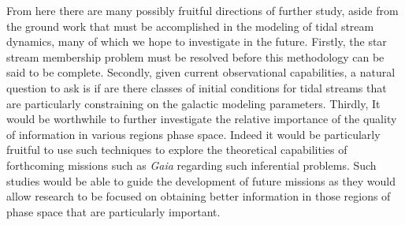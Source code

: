 \documentclass[12pt,preprint]{aastex}
\theoremstyle{plain}
\theoremstyle{definition}
\begin{document}
From here there are many possibly fruitful directions of further study, aside from the ground work that must be accomplished in the modeling of tidal stream dynamics, many of which we hope to investigate in the future. Firstly, the star stream membership problem must be resolved before this methodology can be said to be complete. Secondly, given current observational capabilities, a natural question to ask is if are there  classes of initial conditions for tidal streams that are particularly constraining on the galactic modeling parameters. Thirdly, It would be worthwhile to further investigate the relative importance of the quality of information in various regions phase space. Indeed it would be particularly fruitful to use such techniques to explore the theoretical capabilities of forthcoming missions such as \textit{Gaia} regarding such inferential problems. Such studies would be able to guide the development of future missions as they would allow research to be focused on obtaining better information in those regions of phase space that are particularly important. 



\end{document}
